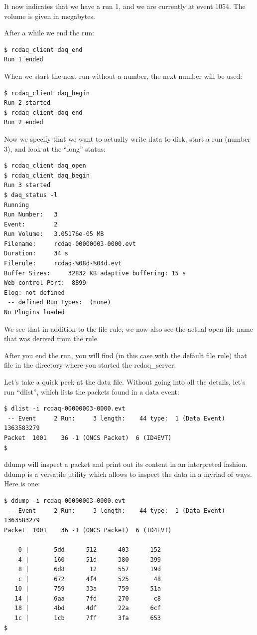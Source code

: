 \documentclass{article}[11pt]
\begin{document}
It now indicates that we have a run 1, and we are currently at event
1054. The volume is given in megabytes.

After a while we end the run:

\begin{verbatim}
$ rcdaq_client daq_end
Run 1 ended
\end{verbatim}

When we start the next run without a number, the next number will be used:

\begin{verbatim}
$ rcdaq_client daq_begin
Run 2 started
$ rcdaq_client daq_end
Run 2 ended
\end{verbatim}

Now we specify that we want to actually write data to disk, start a
run (number 3), and look at the ``long'' status:

\begin{verbatim}
$ rcdaq_client daq_open
$ rcdaq_client daq_begin
Run 3 started
$ daq_status -l
Running
Run Number:   3
Event:        2
Run Volume:   3.05176e-05 MB
Filename:     rcdaq-00000003-0000.evt
Duration:     34 s
Filerule:     rcdaq-%08d-%04d.evt
Buffer Sizes:     32832 KB adaptive buffering: 15 s
Web control Port:  8899
Elog: not defined
 -- defined Run Types:  (none)
No Plugins loaded
\end{verbatim}

We see that in addition to the file rule, we now also see the actual
open file name that was derived from the rule.

After you end the run, you will find (in this case with the default
file rule) that file in the directory where you started the
rcdaq\_server.

Let's take a quick peek at the data file. Without going into all the
details, let's run ``dlist'', which lists the packets found in a data
event:

\begin{verbatim}
$ dlist -i rcdaq-00000003-0000.evt 
 -- Event     2 Run:     3 length:    44 type:  1 (Data Event)  1363583279
Packet  1001    36 -1 (ONCS Packet)  6 (ID4EVT)
$
\end{verbatim}

ddump will inspect a packet and print out its content in an
interpreted fashion. ddump is a versatile utility which allows to
inspect the data in a myriad of ways. Here is one:

\begin{verbatim}
$ ddump -i rcdaq-00000003-0000.evt
 -- Event     2 Run:     3 length:    44 type:  1 (Data Event)  1363583279
Packet  1001    36 -1 (ONCS Packet)  6 (ID4EVT)

    0 |       5dd      512      403      152 
    4 |       160      51d      380      399 
    8 |       6d8       12      557      19d 
    c |       672      4f4      525       48 
   10 |       759      33a      759      51a 
   14 |       6aa      7fd      270       c8 
   18 |       4bd      4df      22a      6cf 
   1c |       1cb      7ff      3fa      653 
$ 
\end{verbatim}
\end{document}

